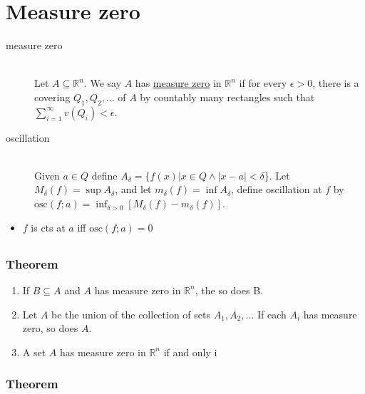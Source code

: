 \section{Measure zero}

\begin{description}
\item[measure zero] \hfill \\
	Let $A\subseteq \mathbb{R}^n$. We say $A$ has \underline{measure zero}
	in $\mathbb{R}^n$ if for every $\epsilon>0$, there is a covering $Q_1, Q_2, \dots$ of $A$
	by countably many rectangles such that
	$\sum_{i=1}^\infty v(Q_i)<\epsilon$.
\item[oscillation] \hfill \\
	Given $a\in Q$ define $A_\delta=\{f(x)|x\in Q \wedge |x-a|<\delta\}$.
	Let $M_\delta(f) = \sup A_\delta$, and let $m_\delta(f) = \inf A_\delta$,
	define oscillation at $f$ by $\mathrm{osc}(f;a)=\inf_{\delta>0}[M_\delta(f)-m_\delta(f)]$.
\end{description}

\begin{itemize}
 \item $f$ is cts at $a$ iff $\mathrm{osc}(f;a)=0$
\end{itemize}

\subsection{}
\subsubsection{Theorem }

\begin{enumerate}
  \item If $B \subseteq A$ and $A$ has measure zero in $\mathbb{R}^n$, the so does B.
  \item Let $A$ be the union of the collection of sets
        $A_1, A_2, \ldots$ If each $A_i$ has measure zero, so does $A$.
  \item A set $A$ has measure zero in $\mathbb{R}^n$ if and only i 
\end{enumerate}

\subsubsection{Theorem }




